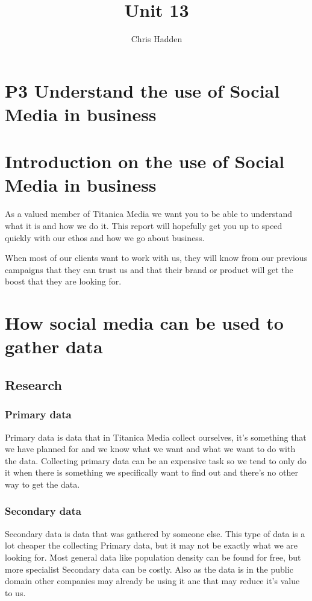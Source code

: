 \documentclass{article}
\begin{document}
\title{Unit 13}
\author{Chris Hadden}
\date{}
\maketitle

\section{P3 Understand the use of Social Media in business}

\section{Introduction on the use of Social Media in business}
As a valued member of Titanica Media we want you to be able to understand what it is and how we do it. This report will hopefully get you up to speed quickly with our ethos and how we go about business.

When most of our clients want to work with us, they will know from our previous campaigns that they can trust us and that their brand or product will get the boost that they are looking for.

\section{How social media can be used to gather data}
\subsection{Research}
\subsubsection{Primary data}
Primary data is data that in Titanica Media collect ourselves, it's something that we have planned for and we know what we want and what we want to do with the data.
Collecting primary data can be an expensive task so we tend to only do it when there is something we specifically want to find out and there's no other way to get the data.

\subsubsection{Secondary data}
Secondary data is data that was gathered by someone else. This type of data is a lot cheaper the collecting Primary data, but it may not be exactly what we are looking for. Most general data like population density can be found for free, but more specialist Secondary data can be costly. Also as the data is in the public domain other companies may already be using it anc that may reduce it's value to us.
\end{document}
